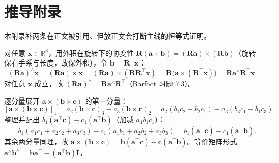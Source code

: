 \section*{推导附录}
\label{sec:rb-appendix}
本附录补两条在正文被引用、但放正文会打断主线的恒等式证明。

\begin{derivation}[恒等式 (I5)：$(\mathbf{R}\mathbf{a})^\wedge=\mathbf{R}\mathbf{a}^\wedge\mathbf{R}^\top$]
对任意 $\mathbf{x}\in\mathbb{R}^3$，用外积在旋转下的协变性 $\mathbf{R}(\mathbf{a}\times\mathbf{b})=(\mathbf{R}\mathbf{a})\times(\mathbf{R}\mathbf{b})$（旋转保右手系与长度，故保外积），令 $\mathbf{b}=\mathbf{R}^\top\mathbf{x}$：
\[
  (\mathbf{R}\mathbf{a})^\wedge\mathbf{x}=(\mathbf{R}\mathbf{a})\times\mathbf{x}=(\mathbf{R}\mathbf{a})\times(\mathbf{R}\mathbf{R}^\top\mathbf{x})
  =\mathbf{R}\big(\mathbf{a}\times(\mathbf{R}^\top\mathbf{x})\big)=\mathbf{R}\mathbf{a}^\wedge\mathbf{R}^\top\mathbf{x}.
\]
对任意 $\mathbf{x}$ 成立，故 $(\mathbf{R}\mathbf{a})^\wedge=\mathbf{R}\mathbf{a}^\wedge\mathbf{R}^\top$（Barfoot 习题 7.3）。
\end{derivation}

\begin{derivation}
逐分量展开 $\mathbf{a}\times(\mathbf{b}\times\mathbf{c})$ 的第一分量：
\[
  [\mathbf{a}\times(\mathbf{b}\times\mathbf{c})]_1=a_2(\mathbf{b}\times\mathbf{c})_3-a_3(\mathbf{b}\times\mathbf{c})_2
  =a_2(b_1c_2-b_2c_1)-a_3(b_3c_1-b_1c_3).
\]
整理并配出 $b_1(\mathbf{a}^\top\mathbf{c})-c_1(\mathbf{a}^\top\mathbf{b})$（加减 $a_1b_1c_1$）：
\[
  =b_1(a_1c_1+a_2c_2+a_3c_3)-c_1(a_1b_1+a_2b_2+a_3b_3)=b_1(\mathbf{a}^\top\mathbf{c})-c_1(\mathbf{a}^\top\mathbf{b}).
\]
其余两分量同理，故 $\mathbf{a}\times(\mathbf{b}\times\mathbf{c})=\mathbf{b}(\mathbf{a}^\top\mathbf{c})-\mathbf{c}(\mathbf{a}^\top\mathbf{b})$。等价矩阵形式 $\mathbf{a}^\wedge\mathbf{b}^\wedge=\mathbf{b}\mathbf{a}^\top-(\mathbf{a}^\top\mathbf{b})\mathbf{I}$。
\end{derivation}
